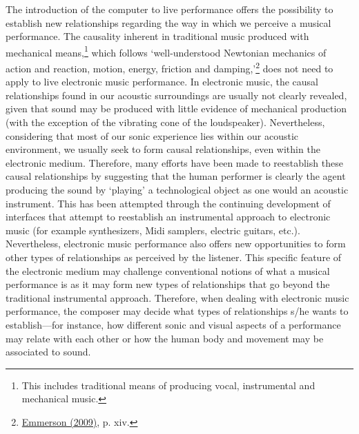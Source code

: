 The introduction of the computer to live performance offers the possibility to establish new relationships regarding the way in which we perceive a musical performance. The causality inherent in traditional music produced with mechanical means,\footnote{This includes traditional means of producing vocal, instrumental and mechanical music.} which follows `well-understood Newtonian mechanics of action and reaction, motion, energy, friction and damping,'\footnote{\hyperlink{emmersonliving}{Emmerson (2009)}, p. xiv.} does not need to apply to live electronic music performance. In electronic music, the causal relationships found in our acoustic surroundings are usually not clearly revealed, given that sound may be produced with little evidence of mechanical production (with the exception of the vibrating cone of the loudspeaker). Nevertheless, considering that most of our sonic experience lies within our acoustic environment, we usually seek to form causal relationships, even within the electronic medium. Therefore, many efforts have been made to reestablish these causal relationships by suggesting that the human performer is clearly the agent producing the sound by `playing' a technological object as one would an acoustic instrument. This has been attempted through the continuing development of interfaces that attempt to reestablish an instrumental approach to electronic music (for example synthesizers, Midi samplers, electric guitars, etc.). Nevertheless, electronic music performance also offers new opportunities to form other types of relationships as perceived by the listener. This specific feature of the electronic medium may challenge conventional notions of what a musical performance is as it may form new types of relationships that go beyond the traditional instrumental approach. Therefore, when dealing with electronic music performance, the composer may decide what types of relationships s/he wants to establish---for instance, how different sonic and visual aspects of a performance may relate with each other or how the human body and movement may be associated to sound. 

